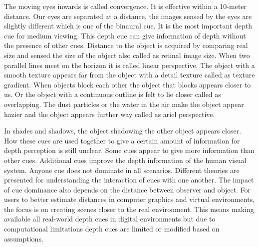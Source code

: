The moving eyes inwards is called convergence. It is effective within a 10-meter distance. Our eyes are separated at a distance, the images sensed by the eyes are slightly different which is one of the binaural cue. It is the most important depth cue for medium viewing. This depth cue can give information of depth without the presence of other cues.
Distance to the object is acquired by comparing real size and sensed the size of the object also called as retinal image size.
When two parallel lines meet on the horizon it is called linear perspective.
The object with a smooth texture appears far from the object with a detail texture called as texture gradient. 
When objects block each other the object that blocks appears closer to us. Or the object with a continuous outline is felt to lie closer called as overlapping. 
The dust particles or the water in the air make the object appear hazier and the object appears further way called as ariel perspective.\par
In shades and shadows, the object shadowing the other object appears closer.
How these cues are used together to give a certain amount of information for depth perception is still unclear. Some cues appear to give more information than other cues. Additional cues improve the depth information of the human visual system. Anyone cue does not dominate in all scenarios. Different theories are presented for understanding the interaction of cues with one another. The impact of cue dominance also depends on the distance between observer and object. 
For users to better estimate distances in computer graphics and virtual environments, the focus is on creating scenes closer to the real environment. This means making available all real-world depth cues in digital environments but due to computational limitations depth cues are limited or modified based on assumptions.\cite{bulthoff1988integration}


